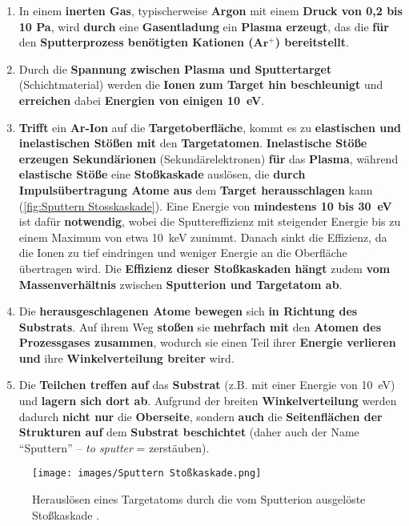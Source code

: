 \documentclass{article} %
\begin{document}
\begin{enumerate}
    \item In einem \textbf{inerten Gas}, typischerweise \textbf{Argon} mit einem \textbf{Druck von 0,2 bis 10 Pa}, wird \textbf{durch} eine \textbf{Gasentladung} ein \textbf{Plasma erzeugt}, das die \textbf{für} den \textbf{Sputterprozess benötigten Kationen ($\mathbf{Ar^+}$) bereitstellt}.
    \item Durch die \textbf{Spannung zwischen Plasma und Sputtertarget} (Schichtmaterial) werden die \textbf{Ionen zum Target hin beschleunigt} und \textbf{erreichen} dabei \textbf{Energien von einigen 10~eV}.
    \item \textbf{Trifft} ein \textbf{Ar-Ion} auf die \textbf{Targetoberfläche}, kommt es zu \textbf{elastischen und inelastischen Stößen mit} den \textbf{Targetatomen}. \textbf{Inelastische Stöße erzeugen Sekundärionen} (Sekundärelektronen) \textbf{für} das \textbf{Plasma}, während \textbf{elastische Stöße} eine \textbf{Stoßkaskade} auslösen, die \textbf{durch Impulsübertragung Atome aus} dem \textbf{Target herausschlagen} kann (\autoref{fig:Sputtern Stosskaskade}). Eine Energie von \textbf{mindestens 10 bis 30~eV} ist dafür \textbf{notwendig}, wobei die Sputtereffizienz mit steigender Energie bis zu einem Maximum von etwa 10~keV zunimmt. Danach sinkt die Effizienz, da die Ionen zu tief eindringen und weniger Energie an die Oberfläche übertragen wird. Die \textbf{Effizienz dieser Stoßkaskaden hängt} zudem \textbf{vom Massenverhältnis} zwischen \textbf{Sputterion und Targetatom ab}.
    \item Die \textbf{herausgeschlagenen Atome bewegen} sich \textbf{in Richtung des Substrats}. Auf ihrem Weg \textbf{stoßen} sie \textbf{mehrfach mit} den \textbf{Atomen des Prozessgases zusammen}, wodurch sie einen Teil ihrer \textbf{Energie verlieren und} ihre \textbf{Winkelverteilung breiter} wird.
    \item Die \textbf{Teilchen treffen auf} das \textbf{Substrat} (z.B. mit einer Energie von 10~eV) und \textbf{lagern sich dort ab}. Aufgrund der breiten \textbf{Winkelverteilung} werden dadurch \textbf{nicht nur} die \textbf{Oberseite}, sondern \textbf{auch} die \textbf{Seitenflächen der Strukturen auf} dem \textbf{Substrat beschichtet} (daher auch der Name ``Sputtern'' -- \textit{to sputter} = zerstäuben).
\end{enumerate}

\begin{figure}[htb!]
    \centering
    \texttt{[image: images/Sputtern Stoßkaskade.png]} %
    \captionsetup{labelfont=bf, width=.6\textwidth} %
    \caption{Herauslösen eines Targetatoms durch die vom Sputterion ausgelöste Stoßkaskade \cite{keplinger2024}.}
    \label{fig:Sputtern Stosskaskade}
\end{figure}
\end{document}
